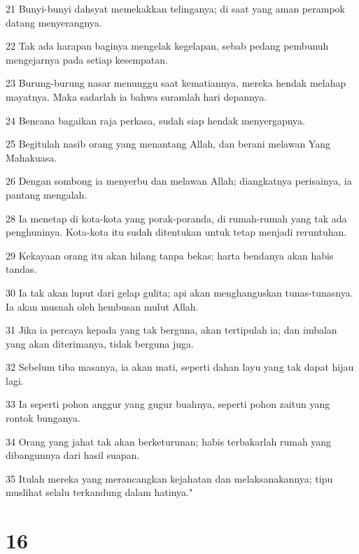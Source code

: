 \par 21 Bunyi-bunyi dahsyat memekakkan telinganya; di saat yang aman perampok datang menyerangnya.
\par 22 Tak ada harapan baginya mengelak kegelapan, sebab pedang pembunuh mengejarnya pada setiap kesempatan.
\par 23 Burung-burung nasar menunggu saat kematiannya, mereka hendak melahap mayatnya. Maka sadarlah ia bahwa suramlah hari depannya.
\par 24 Bencana bagaikan raja perkasa, sudah siap hendak menyergapnya.
\par 25 Begitulah nasib orang yang menantang Allah, dan berani melawan Yang Mahakuasa.
\par 26 Dengan sombong ia menyerbu dan melawan Allah; diangkatnya perisainya, ia pantang mengalah.
\par 28 Ia menetap di kota-kota yang porak-poranda, di rumah-rumah yang tak ada penghuninya. Kota-kota itu sudah ditentukan untuk tetap menjadi reruntuhan.
\par 29 Kekayaan orang itu akan hilang tanpa bekas; harta bendanya akan habis tandas.
\par 30 Ia tak akan luput dari gelap gulita; api akan menghanguskan tunas-tunasnya. Ia akan musnah oleh hembusan mulut Allah.
\par 31 Jika ia percaya kepada yang tak berguna, akan tertipulah ia; dan imbalan yang akan diterimanya, tidak berguna juga.
\par 32 Sebelum tiba masanya, ia akan mati, seperti dahan layu yang tak dapat hijau lagi.
\par 33 Ia seperti pohon anggur yang gugur buahnya, seperti pohon zaitun yang rontok bunganya.
\par 34 Orang yang jahat tak akan berketurunan; habis terbakarlah rumah yang dibangunnya dari hasil suapan.
\par 35 Itulah mereka yang merancangkan kejahatan dan melaksanakannya; tipu muslihat selalu terkandung dalam hatinya."

\chapter{16}

